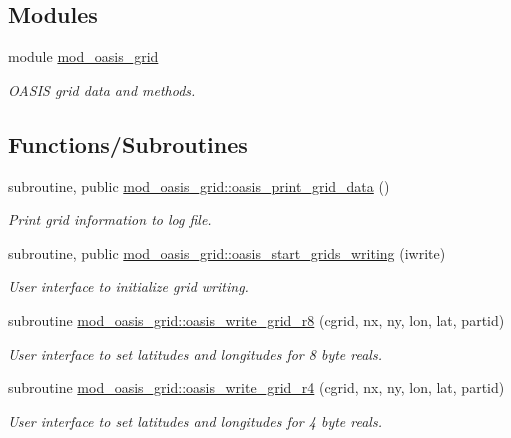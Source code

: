 \subsection*{Modules}
\begin{DoxyCompactItemize}
\item 
module \hyperlink{namespacemod__oasis__grid}{mod\+\_\+oasis\+\_\+grid}
\begin{DoxyCompactList}\small\item\em O\+A\+S\+IS grid data and methods. \end{DoxyCompactList}\end{DoxyCompactItemize}
\subsection*{Functions/\+Subroutines}
\begin{DoxyCompactItemize}
\item 
subroutine, public \hyperlink{namespacemod__oasis__grid_a4bc230ba4aa317f666bdab2416b4f6da}{mod\+\_\+oasis\+\_\+grid\+::oasis\+\_\+print\+\_\+grid\+\_\+data} ()
\begin{DoxyCompactList}\small\item\em Print grid information to log file. \end{DoxyCompactList}\item 
subroutine, public \hyperlink{namespacemod__oasis__grid_acb0569d8677f0762559ed6b211945d9b}{mod\+\_\+oasis\+\_\+grid\+::oasis\+\_\+start\+\_\+grids\+\_\+writing} (iwrite)
\begin{DoxyCompactList}\small\item\em User interface to initialize grid writing. \end{DoxyCompactList}\item 
subroutine \hyperlink{namespacemod__oasis__grid_a61a1b9209b5012b58fadf2a79284e1e7}{mod\+\_\+oasis\+\_\+grid\+::oasis\+\_\+write\+\_\+grid\+\_\+r8} (cgrid, nx, ny, lon, lat, partid)
\begin{DoxyCompactList}\small\item\em User interface to set latitudes and longitudes for 8 byte reals. \end{DoxyCompactList}\item 
subroutine \hyperlink{namespacemod__oasis__grid_a74137e0541f8a9e2b1f05918b7f8da17}{mod\+\_\+oasis\+\_\+grid\+::oasis\+\_\+write\+\_\+grid\+\_\+r4} (cgrid, nx, ny, lon, lat, partid)
\begin{DoxyCompactList}\small\item\em User interface to set latitudes and longitudes for 4 byte reals. \end{DoxyCompactList}\item 

\end{DoxyCompactItemize}
